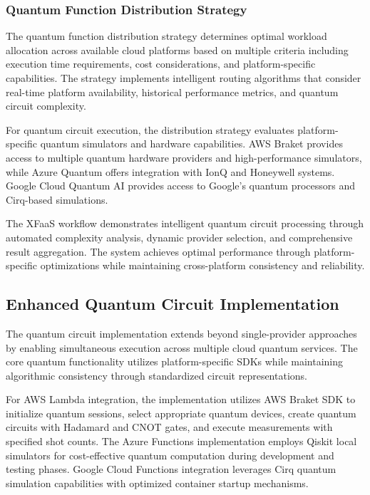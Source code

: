 \documentclass[onecolumn]{IEEEtran}
\begin{document}
\subsubsection{Quantum Function Distribution Strategy}

The quantum function distribution strategy determines optimal workload allocation across available cloud platforms based on multiple criteria including execution time requirements, cost considerations, and platform-specific capabilities. The strategy implements intelligent routing algorithms that consider real-time platform availability, historical performance metrics, and quantum circuit complexity.

For quantum circuit execution, the distribution strategy evaluates platform-specific quantum simulators and hardware capabilities. AWS Braket provides access to multiple quantum hardware providers and high-performance simulators, while Azure Quantum offers integration with IonQ and Honeywell systems. Google Cloud Quantum AI provides access to Google's quantum processors and Cirq-based simulations.

The XFaaS workflow demonstrates intelligent quantum circuit processing through automated complexity analysis, dynamic provider selection, and comprehensive result aggregation. The system achieves optimal performance through platform-specific optimizations while maintaining cross-platform consistency and reliability.



\subsection{Enhanced Quantum Circuit Implementation}

The quantum circuit implementation extends beyond single-provider approaches by enabling simultaneous execution across multiple cloud quantum services. The core quantum functionality utilizes platform-specific SDKs while maintaining algorithmic consistency through standardized circuit representations.

For AWS Lambda integration, the implementation utilizes AWS Braket SDK to initialize quantum sessions, select appropriate quantum devices, create quantum circuits with Hadamard and CNOT gates, and execute measurements with specified shot counts. The Azure Functions implementation employs Qiskit local simulators for cost-effective quantum computation during development and testing phases. Google Cloud Functions integration leverages Cirq quantum simulation capabilities with optimized container startup mechanisms.
\end{document}
